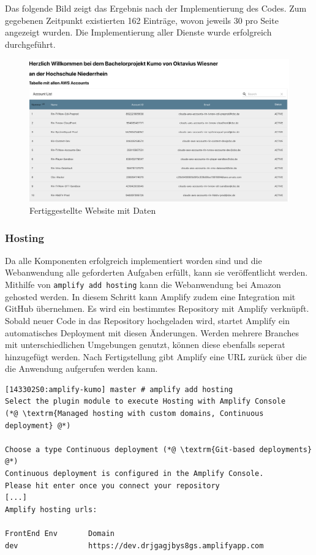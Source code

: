  Das folgende Bild zeigt das Ergebnis nach der Implementierung des Codes.
 Zum gegebenen Zeitpunkt existierten 162 Einträge, wovon jeweils 30 pro Seite angezeigt wurden.
 Die Implementierung aller Dienste wurde erfolgreich durchgeführt.

 \begin{figure}[htbp]
    \centering
    \includegraphics[width=1.0\textwidth]{50-Implementierung/Webanwendung.png}
    \caption{Fertiggestellte Website mit Daten}
    \label{fig:FertigSeite}
\end{figure}

\subsubsection{Hosting}

Da alle Komponenten erfolgreich implementiert worden sind und die Webanwendung alle geforderten Aufgaben erfüllt, kann sie veröffentlicht werden.
Mithilfe von \verb+amplify add hosting+ kann die Webanwendung bei Amazon gehosted werden.
In diesem Schritt kann Amplify zudem eine Integration mit GitHub übernehmen.
Es wird ein bestimmtes Repository mit Amplify verknüpft.
Sobald neuer Code in das Repository hochgeladen wird, startet Amplify ein automatisches Deployment mit diesen Änderungen.
Werden mehrere Branches mit unterschiedlichen Umgebungen genutzt, können diese ebenfalls seperat hinzugefügt werden.
Nach Fertigstellung gibt Amplify eine URL zurück über die die Anwendung aufgerufen werden kann.
\\
\begin{lstlisting}[basicstyle=\ttfamily\small, breaklines=true , frame = single, backgroundcolor=\color{flashwhite} ]
[143302S0:amplify-kumo] master # amplify add hosting
Select the plugin module to execute Hosting with Amplify Console
(*@ \textrm{Managed hosting with custom domains, Continuous deployment} @*)

Choose a type Continuous deployment (*@ \textrm{Git-based deployments} @*)
Continuous deployment is configured in the Amplify Console.
Please hit enter once you connect your repository
[...]
Amplify hosting urls:

FrontEnd Env       Domain
dev                https://dev.drjgagjbys8gs.amplifyapp.com

    \end{lstlisting}

